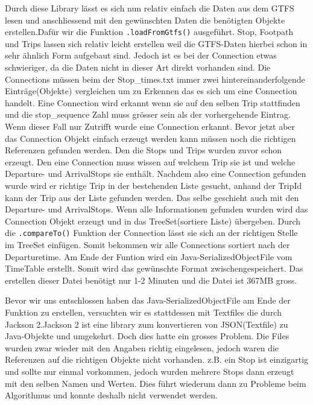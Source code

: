 Durch diese Library lässt es sich nun relativ einfach die Daten aus dem GTFS lesen und anschliessend mit den gewünschten Daten die benötigten Objekte erstellen.Dafür wir die Funktion \texttt{.loadFromGtfs()} ausgeführt.  Stop, Footpath und Trips lassen sich relativ leicht erstellen weil die GTFS-Daten hierbei schon in sehr ähnlich Form aufgebaut sind. Jedoch ist es bei der Connection etwas schwieriger, da die Daten nicht in dieser Art direkt vorhanden sind. Die Connections müssen beim der Stop\_times.txt immer zwei hintereinanderfolgende Einträge(Objekte) vergleichen um zu Erkennen das es sich um eine Connection handelt. Eine Connection wird erkannt wenn sie auf den selben Trip stattfinden und die stop\_sequence Zahl muss grösser sein als der vorhergehende Eintrag. Wenn dieser Fall nur Zutrifft wurde eine Connection erkannt. Bevor jetzt aber das Connection Objekt einfach erzeugt werden kann müssen noch die richtigen Referenzen gefunden werden. Den die Stops und Trips wurden zuvor schon erzeugt. Den eine Connection muss wissen auf welchem Trip sie ist und welche Departure- und ArrivalStops sie enthält. Nachdem also eine Connection gefunden wurde wird er richtige Trip in der bestehenden Liste gesucht, anhand der TripId kann der Trip aus der Liste gefunden werden. Das selbe geschieht auch mit den Departure- und ArrivalStops. Wenn alle Informationen gefunden wurden wird das Connection Objekt erzeugt und in das TreeSet(sortiere Liste) übergeben. Durch die \texttt{.compareTo()} Funktion der Connection lässt sie sich an der richtigen Stelle im TreeSet einfügen. Somit bekommen wir alle Connections sortiert nach der Departuretime. Am Ende der Funtion wird ein Java-SerializedObjectFile vom TimeTable erstellt. Somit wird das gewünschte Format zwischengespeichert. Das erstellen dieser Datei benötigt nur 1-2 Minuten und die Datei ist 367MB gross.\newline

Bevor wir uns entschlossen haben das Java-SerializedObjectFile am Ende der Funktion zu erstellen, versuchten wir es stattdessen mit Textfiles die durch Jackson 2.Jackson 2 ist eine library zum konvertieren von JSON(Textfile) zu Java-Objekte und umgekehrt. Doch dies hatte ein grosses Problem. Die Files wurden zwar wieder mit den Angaben richtig eingelesen, jedoch waren die Referenzen auf die richtigen Objekte nicht vorhanden. z.B. ein Stop ist einzigartig und sollte nur einmal vorkommen, jedoch wurden mehrere Stops dann erzeugt mit den selben Namen und Werten. Dies führt wiederum dann zu Probleme beim Algorithmus und konnte deshalb nicht verwendet werden.

